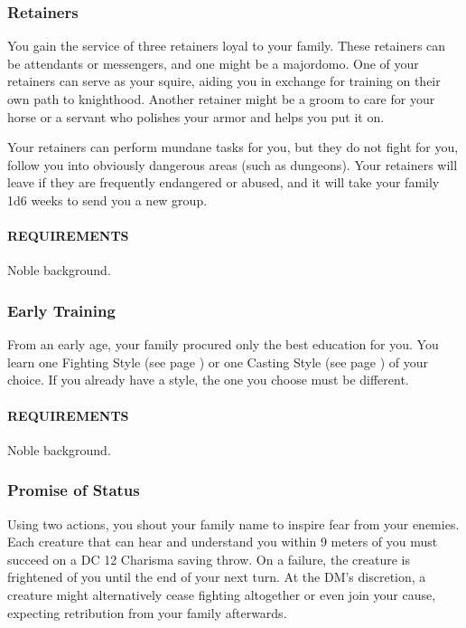     \subsubsection{Retainers} \label{feat::retainers}
        You gain the service of three retainers loyal to your family.
        These retainers can be attendants or messengers, and one might be a majordomo.
        One of your retainers can serve as your squire, aiding you in exchange for training on their own path to knighthood.
        Another retainer might be a groom to care for your horse or a servant who polishes your armor and helps you put it on.

        Your retainers can perform mundane tasks for you, but they do not fight for you, follow you into obviously dangerous areas (such as dungeons).
        Your retainers will leave if they are frequently endangered or abused, and it will take your family 1d6 weeks to send you a new group.
        \paragraph{REQUIREMENTS} Noble background.

    \subsubsection{Early Training} \label{feat::earlytraining}
        From an early age, your family procured only the best education for you.
        You learn one Fighting Style (see page \pageref{ssec::fightingstyles}) or one Casting Style (see page \pageref{ssec::castingstyle}) of your choice.
        If you already have a style, the one you choose must be different.
        \paragraph{REQUIREMENTS} Noble background.

    \subsubsection{Promise of Status} \label{feat::promiseofstatus}
        Using two actions, you shout your family name to inspire fear from your enemies.
        Each creature that can hear and understand you within 9 meters of you must succeed on a DC 12 Charisma saving throw.
        On a failure, the creature is frightened of you until the end of your next turn.
        At the DM's discretion, a creature might alternatively cease fighting altogether or even join your cause, expecting retribution from your family afterwards.


